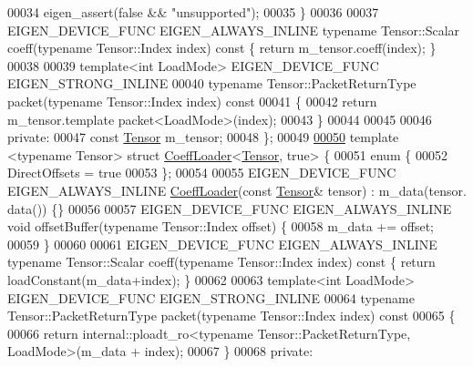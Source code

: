 \begin{DoxyCode}
00034     eigen\_assert(\textcolor{keyword}{false} && \textcolor{stringliteral}{"unsupported"});
00035   \}
00036 
00037   EIGEN\_DEVICE\_FUNC EIGEN\_ALWAYS\_INLINE \textcolor{keyword}{typename} Tensor::Scalar coeff(\textcolor{keyword}{typename} Tensor::Index index)\textcolor{keyword}{ const }\{
       \textcolor{keywordflow}{return} m\_tensor.coeff(index); \}
00038 
00039  \textcolor{keyword}{template}<\textcolor{keywordtype}{int} LoadMode> EIGEN\_DEVICE\_FUNC EIGEN\_STRONG\_INLINE
00040  \textcolor{keyword}{typename} Tensor::PacketReturnType packet(\textcolor{keyword}{typename} Tensor::Index index)\textcolor{keyword}{ const}
00041 \textcolor{keyword}{  }\{
00042     \textcolor{keywordflow}{return} m\_tensor.template packet<LoadMode>(index);
00043   \}
00044 
00045 
00046  \textcolor{keyword}{private}:
00047   \textcolor{keyword}{const} \hyperlink{class_eigen_1_1_tensor}{Tensor} m\_tensor;
00048 \};
00049 
\hyperlink{struct_eigen_1_1internal_1_1_coeff_loader_3_01_tensor_00_01true_01_4}{00050} \textcolor{keyword}{template} <\textcolor{keyword}{typename} Tensor> \textcolor{keyword}{struct }\hyperlink{struct_eigen_1_1internal_1_1_coeff_loader}{CoeffLoader}<\hyperlink{class_eigen_1_1_tensor}{Tensor}, true> \{
00051   \textcolor{keyword}{enum} \{
00052     DirectOffsets = \textcolor{keyword}{true}
00053   \};
00054 
00055   EIGEN\_DEVICE\_FUNC EIGEN\_ALWAYS\_INLINE \hyperlink{struct_eigen_1_1internal_1_1_coeff_loader}{CoeffLoader}(\textcolor{keyword}{const} \hyperlink{class_eigen_1_1_tensor}{Tensor}& tensor) : m\_data(tensor.
      data()) \{\}
00056 
00057   EIGEN\_DEVICE\_FUNC EIGEN\_ALWAYS\_INLINE \textcolor{keywordtype}{void} offsetBuffer(\textcolor{keyword}{typename} Tensor::Index offset) \{
00058     m\_data += offset;
00059   \}
00060 
00061   EIGEN\_DEVICE\_FUNC EIGEN\_ALWAYS\_INLINE \textcolor{keyword}{typename} Tensor::Scalar coeff(\textcolor{keyword}{typename} Tensor::Index index)\textcolor{keyword}{ const }\{
       \textcolor{keywordflow}{return} loadConstant(m\_data+index); \}
00062 
00063  \textcolor{keyword}{template}<\textcolor{keywordtype}{int} LoadMode> EIGEN\_DEVICE\_FUNC EIGEN\_STRONG\_INLINE
00064  \textcolor{keyword}{typename} Tensor::PacketReturnType packet(\textcolor{keyword}{typename} Tensor::Index index)\textcolor{keyword}{ const}
00065 \textcolor{keyword}{  }\{
00066     \textcolor{keywordflow}{return} internal::ploadt\_ro<typename Tensor::PacketReturnType, LoadMode>(m\_data + index);
00067   \}
00068  \textcolor{keyword}{private}:

\end{DoxyCode}
